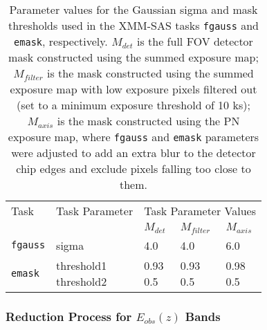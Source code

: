 \documentclass[fleqn,usenatbib]{mnras}
\begin{document}
        
        \begin{table}
        \caption{Parameter values for the Gaussian sigma and mask thresholds used in the XMM-SAS tasks \texttt{fgauss} and \texttt{emask}, respectively. $M_{det}$ is the full FOV detector mask constructed using the summed exposure map; $M_{filter}$ is the mask constructed using the summed exposure map with low exposure pixels filtered out (set to a minimum exposure threshold of 10 ks); $M_{axis}$ is the mask constructed using the PN exposure map, where \texttt{fgauss} and \texttt{emask} parameters were adjusted to add an extra blur to the detector chip edges and exclude pixels falling too close to them.}
        \centering
        \begin{tabularx}{\linewidth}{XXXXX}
        	\hline
        	Task            &     Task Parameter &                 \multicolumn{3}{c}{Task Parameter Values}       \\
                            &                    &       $M_{det}$ &                  $M_{filter}$ &    $M_{axis}$ \\
            \hline
            \texttt{fgauss} &              sigma &             4.0 &                           4.0 &           6.0 \\
            \texttt{emask}  &    \parbox{2cm}{\vspace{1.5mm} threshold1 \\ threshold2 \vspace{1.5mm}} &    \parbox{2cm}{\vspace{1.5mm} 0.93 \\ 0.5 \vspace{1.5mm}} &    \parbox{2cm}{\vspace{1.5mm} 0.93 \\ 0.5 \vspace{1.5mm}} &    \parbox{2cm}{\vspace{1.5mm} 0.98 \\ 0.5 \vspace{1.5mm}} \\
            \hline  
            \end{tabularx}
        \label{table:parvals}
        \end{table}
	  
    
    
        \subsubsection{Reduction Process for $E_{obs}(z)$ Bands}\label{subsubsec:sourcelistprocess}
\end{document}
